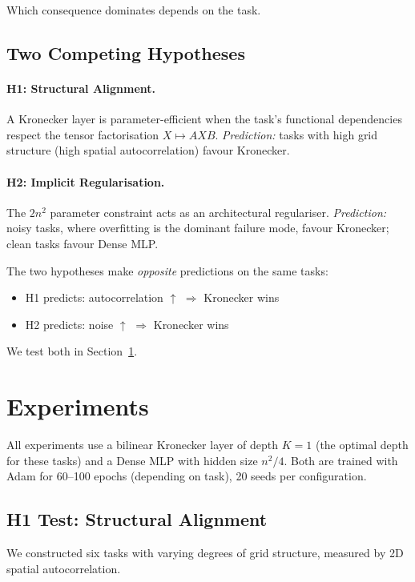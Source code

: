 \documentclass[11pt,a4paper]{article}
\begin{document}
Which consequence dominates depends on the task.

\subsection{Two Competing Hypotheses}
\label{sec:hypotheses}

\paragraph{H1: Structural Alignment.}
A Kronecker layer is parameter-efficient when the task's functional
dependencies respect the tensor factorisation $X \mapsto AXB$.
\emph{Prediction:} tasks with high grid structure (high spatial
autocorrelation) favour Kronecker.

\paragraph{H2: Implicit Regularisation.}
The $2n^2$ parameter constraint acts as an architectural
regulariser. \emph{Prediction:} noisy tasks, where overfitting is
the dominant failure mode, favour Kronecker; clean tasks favour
Dense MLP.

The two hypotheses make \emph{opposite} predictions on the same
tasks:
\begin{itemize}
\item H1 predicts: autocorrelation $\uparrow$ $\Rightarrow$
      Kronecker wins
\item H2 predicts: noise $\uparrow$ $\Rightarrow$ Kronecker wins
\end{itemize}

We test both in Section~\ref{sec:experiments}.


\section{Experiments}
\label{sec:experiments}

All experiments use a bilinear Kronecker layer of depth $K=1$
(the optimal depth for these tasks) and a Dense MLP with hidden
size $n^2/4$. Both are trained with Adam for 60--100 epochs
(depending on task), 20 seeds per configuration.

\subsection{H1 Test: Structural Alignment}
\label{sec:h1}

We constructed six tasks with varying degrees of grid structure,
measured by 2D spatial autocorrelation.
\end{document}
